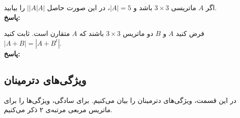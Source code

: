 \begin{example}
	اگر $A$ ماتریسی
	$3 \times 3$
	باشد و
	$|A|=5$،
	در این صورت حاصل
	$\left||A|A\right|$
	را بیابید. \\
	\textbf{پاسخ:}
\end{example}

\begin{example}
	فرض کنید $A$ و $B$ دو ماتریس
	$3 \times 3$
	باشند که $A$ متقارن است. ثابت کنید
	$|A+B|=|A+B^t|$.
	\\ \textbf{پاسخ:}
\end{example}

\subsection{ویژگی‌های دترمینان}
در این قسمت، ویژگی‌های دترمینان را بیان می‌کنیم. برای سادگی، ویژگی‌ها را برای ماتریس مربعی مرتبه‌ی ۲ ذکر می‌کنیم.
